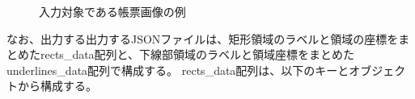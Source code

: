 \begin{figure}[tp]
    \begin{center}
        \caption{入力対象である帳票画像の例}
        \label{fig:original}
    \end{center}
\end{figure}

なお、出力する出力するJSONファイルは、矩形領域のラベルと領域の座標をまとめたrects\_data配列と、下線部領域のラベルと領域座標をまとめたunderlines\_data配列で構成する。
rects\_data配列は、以下のキーとオブジェクトから構成する。

